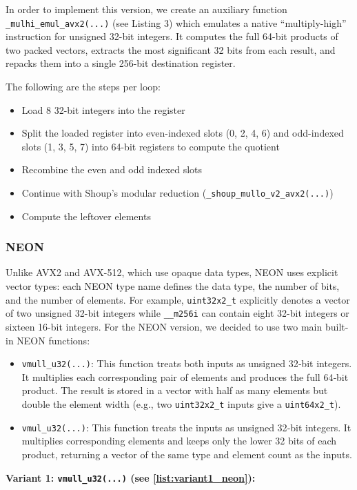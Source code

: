 \documentclass{article}
\newcommand{\pointlabel}[1]{\par\smallskip\noindent\textbf{\textcolor{accentorange}{#1:}} }
\begin{document}
In order to implement this version, we create an auxiliary function \texttt{\_mulhi\_emul\_avx2(...)} (see Listing 3) which emulates a native ``multiply-high'' instruction for unsigned 32-bit integers. It computes the full 64-bit products of two packed vectors, extracts the most significant 32 bits from each result, and repacks them into a single 256-bit destination register.

The following are the steps per loop:
\begin{itemize}
    \item Load 8 32-bit integers into the register
    \item Split the loaded register into even-indexed slots (0, 2, 4, 6) and odd-indexed slots (1, 3, 5, 7) into 64-bit registers to compute the quotient
    \item Recombine the even and odd indexed slots
    \item Continue with Shoup's modular reduction (\texttt{\_shoup\_mullo\_v2\_avx2(...)})
    \item Compute the leftover elements
\end{itemize}


\subsubsection{NEON}
Unlike AVX2 and AVX-512, which use opaque data types, NEON uses explicit vector types: each NEON type name defines the data type, the number of bits, and the number of elements. For example, \texttt{uint32x2\_t} explicitly denotes a vector of two unsigned 32-bit integers while \texttt{\_\_m256i} can contain eight 32-bit integers or sixteen 16-bit integers.
\newline
For the NEON version, we decided to use two main built-in NEON functions:
\begin{itemize}
    \item \texttt{vmull\_u32(...)}: This function treats both inputs as unsigned 32‑bit integers. It multiplies each corresponding pair of elements and produces the full 64‑bit product. The result is stored in a vector with half as many elements but double the element width (e.g., two \texttt{uint32x2\_t} inputs give a \texttt{uint64x2\_t}).
    \item \texttt{vmul\_u32(...)}: This function treats the inputs as unsigned 32‑bit integers. It multiplies corresponding elements and keeps only the lower 32 bits of each product, returning a vector of the same type and element count as the inputs.
\end{itemize}
\pointlabel{Variant 1: \texttt{vmull\_u32(...)} (see \autoref{list:variant1_neon})}
\end{document}
